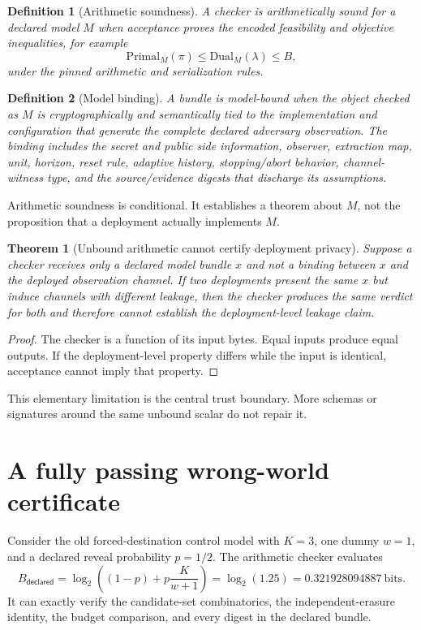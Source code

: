 \documentclass[11pt]{article}
\newtheorem{theorem}{Theorem}
\newtheorem{definition}{Definition}
\begin{document}
\begin{definition}[Arithmetic soundness]
A checker is arithmetically sound for a declared model \(M\) when acceptance proves the encoded feasibility and objective inequalities, for example
\[
\mathrm{Primal}_M(\pi)\le \mathrm{Dual}_M(\lambda)\le B,
\]
under the pinned arithmetic and serialization rules.
\end{definition}

\begin{definition}[Model binding]
A bundle is model-bound when the object checked as \(M\) is cryptographically and semantically tied to the implementation and configuration that generate the complete declared adversary observation. The binding includes the secret and public side information, observer, extraction map, unit, horizon, reset rule, adaptive history, stopping/abort behavior, channel-witness type, and the source/evidence digests that discharge its assumptions.
\end{definition}

Arithmetic soundness is conditional. It establishes a theorem about \(M\), not the proposition that a deployment actually implements \(M\).

\begin{theorem}[Unbound arithmetic cannot certify deployment privacy]\label{thm:impossibility}
Suppose a checker receives only a declared model bundle \(x\) and not a binding between \(x\) and the deployed observation channel. If two deployments present the same \(x\) but induce channels with different leakage, then the checker produces the same verdict for both and therefore cannot establish the deployment-level leakage claim.
\end{theorem}

\begin{proof}
The checker is a function of its input bytes. Equal inputs produce equal outputs. If the deployment-level property differs while the input is identical, acceptance cannot imply that property.
\end{proof}

This elementary limitation is the central trust boundary. More schemas or signatures around the same unbound scalar do not repair it.

\section{A fully passing wrong-world certificate}\label{sec:ghost}
Consider the old forced-destination control model with \(K=3\), one dummy \(w=1\), and a declared reveal probability \(p=1/2\). The arithmetic checker evaluates
\[
B_{\mathsf{declared}}
=\log_2\!\left((1-p)+p\frac{K}{w+1}\right)
=\log_2(1.25)
=0.321928094887\ \text{bits}.
\]
It can exactly verify the candidate-set combinatorics, the independent-erasure identity, the budget comparison, and every digest in the declared bundle.
\end{document}
